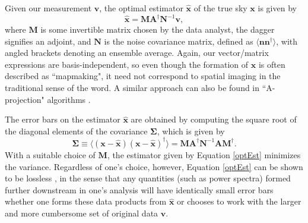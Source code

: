 \documentclass[twocolumn,apj,numberedappendix]{emulateapj}
\newcommand{\vis}{\mathbf{v}}
\newcommand{\x}{\mathbf{x}}
\newcommand{\xhat}{\hat{\mathbf{x}}}
\newcommand{\A}{\mathbf{A}}
\newcommand{\N}{\mathbf{N}}
\begin{document}
Given our measurement $\vis$, the optimal estimator $\xhat$ of the true sky
$\x$ is given by \citep{T97mapmaking,Morales2009,dillon_et_al2015}
\begin{equation}
\label{optEst}
\xhat = \mathbf{M} \A^\dagger \N^{-1} \vis,
\end{equation}
where $\mathbf{M}$ is some invertible matrix chosen by the data analyst, 
the dagger signifies an adjoint, and
$\N$ is the noise covariance matrix, defined as $\langle \mathbf{n}
\mathbf{n}^\dagger \rangle$, with angled brackets denoting an ensemble average.
Again, our vector/matrix expressions are basis-independent, so even though the
formation of $\xhat$ is often described as ``mapmaking", it need not correspond
to spatial imaging in the traditional sense of the word. A similar approach
can also be found in ``A-projection" algorithms \citep{bhatnagar_et_al2008,
bhatnagar_et_al2013,tasse_et_al2013}.

The error bars on the estimator $\xhat$ are obtained by computing the square root
of the diagonal elements of the covariance $\boldsymbol \Sigma$, which is given by
\begin{equation}
\label{eq:sigma}
\boldsymbol \Sigma \equiv \langle (\x - \xhat) ( \x - \xhat)^\dagger \rangle = \mathbf{M} \A^\dagger \N^{-1} \A\mathbf{M}^\dagger.
\end{equation}
With a suitable choice of $\mathbf{M}$, the estimator given by Equation \eqref{optEst}
minimizes the variance. Regardless of one's choice, however, Equation \eqref{optEst} 
can be shown to be lossless \citep{T97mapmaking}, in the sense that any quantities (such as power
spectra) formed further downstream in one's analysis will have identically
small error bars whether one forms these data products from $\xhat$ or chooses
to work with the larger and more cumbersome set of original data $\vis$.
%
%
%
\end{document}
